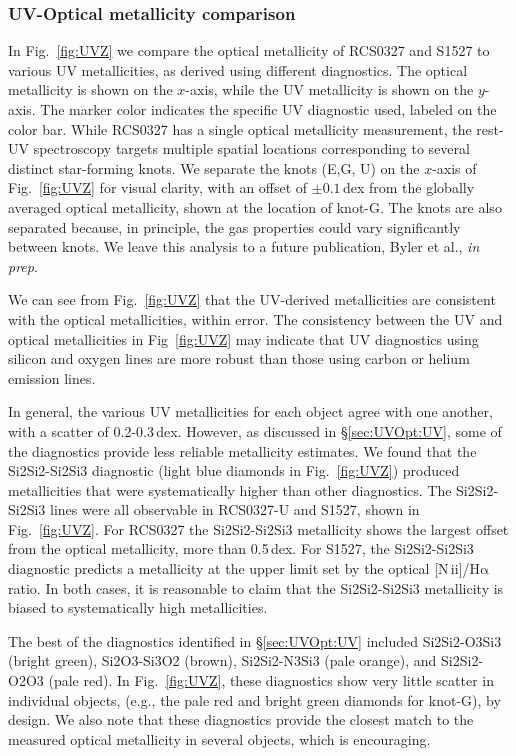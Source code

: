 \documentclass[preprint2]{aastex62}
\newcommand{\nii}{[N\,{\sc ii}]\xspace}
\newcommand{\ha}{\ensuremath{\mathrm{H\alpha}}\xspace}
\begin{document}
\subsubsection{UV-Optical metallicity comparison}\label{sec:UVOpt:Opt}

In Fig.~\ref{fig:UVZ} we compare the optical metallicity of RCS0327 and S1527 to various UV metallicities, as derived using different diagnostics. The optical metallicity is shown on the $x$-axis, while the UV metallicity is shown on the $y$-axis. The marker color indicates the specific UV diagnostic used, labeled on the color bar. While RCS0327 has a single optical metallicity measurement, the rest-UV spectroscopy targets multiple spatial locations corresponding to several distinct star-forming knots. We separate the knots (E,G, U) on the $x$-axis of Fig.~\ref{fig:UVZ} for visual clarity, with an offset of $\pm 0.1$\,dex from the globally averaged optical metallicity, shown at the location of knot-G. The knots are also separated because, in principle, the gas properties could vary significantly between knots. We leave this analysis to a future publication, Byler et al., \emph{in prep}.

We can see from Fig.~\ref{fig:UVZ} that the UV-derived metallicities are consistent with the optical metallicities, within error. The consistency between the UV and optical metallicities in Fig~\ref{fig:UVZ} may indicate that UV diagnostics using silicon and oxygen lines are more robust than those using carbon or helium emission lines.

In general, the various UV metallicities for each object agree with one another, with a scatter of 0.2-0.3\,dex. However, as discussed in \S\ref{sec:UVOpt:UV}, some of the diagnostics provide less reliable metallicity estimates. We found that the Si2Si2-Si2Si3 diagnostic (light blue diamonds in Fig.~\ref{fig:UVZ}) produced metallicities that were systematically higher than other diagnostics. The Si2Si2-Si2Si3 lines were all observable in RCS0327-U and S1527, shown in Fig.~\ref{fig:UVZ}. For RCS0327 the Si2Si2-Si2Si3 metallicity shows the largest offset from the optical metallicity, more than 0.5\,dex. For S1527, the Si2Si2-Si2Si3 diagnostic predicts a metallicity at the upper limit set by the optical \nii/\ha ratio. In both cases, it is reasonable to claim that the Si2Si2-Si2Si3 metallicity is biased to systematically high metallicities.

The best of the diagnostics identified in \S\ref{sec:UVOpt:UV} included Si2Si2-O3Si3 (bright green), Si2O3-Si3O2 (brown), Si2Si2-N3Si3 (pale orange), and Si2Si2-O2O3 (pale red). In Fig.~\ref{fig:UVZ}, these diagnostics show very little scatter in individual objects, (e.g., the pale red and bright green diamonds for knot-G), by design. We also note that these diagnostics provide the closest match to the measured optical metallicity in several objects, which is encouraging.
\end{document}
